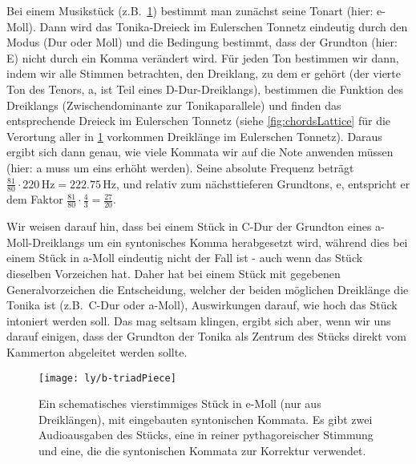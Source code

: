 \documentclass[ngerman,11pt]{scrartcl}
\begin{document}
Bei einem Musikstück (z.B.\ \cref{fig:triadPiece}) bestimmt man zunächst seine
Tonart (hier: e-Moll). Dann wird das Tonika-Dreieck im Eulerschen Tonnetz
eindeutig durch den Modus (Dur oder Moll) und die Bedingung bestimmt, dass der
Grundton (hier: E) nicht durch ein Komma verändert wird. Für jeden Ton bestimmen
wir dann, indem wir alle Stimmen betrachten, den Dreiklang, zu dem er gehört
(der vierte Ton des Tenors, a, ist Teil eines D-Dur-Dreiklangs), bestimmen die
Funktion des Dreiklangs (Zwischendominante zur Tonikaparallele) und finden das
entsprechende Dreieck im Eulerschen Tonnetz (siehe \cref{fig:chordsLattice} für
die Verortung aller in \cref{fig:triadPiece} vorkommen Dreiklänge im Eulerschen
Tonnetz). Daraus ergibt sich dann genau, wie viele Kommata wir auf die Note
anwenden müssen (hier: a muss um eins erhöht werden). Seine absolute Frequenz
beträgt $\frac{81}{80}\cdot 220\,\text{Hz}=222.75\,\text{Hz}$, und relativ zum
nächsttieferen Grundtons, e, entspricht er dem Faktor
$\frac{81}{80}\cdot\frac{4}{3}=\frac{27}{20}$.

Wir weisen darauf hin, dass bei einem Stück in C-Dur der Grundton eines
a-Moll-Dreiklangs um ein syntonisches Komma herabgesetzt wird, während dies bei
einem Stück in a-Moll eindeutig nicht der Fall ist - auch wenn das Stück
dieselben Vorzeichen hat. Daher hat bei einem Stück mit gegebenen
Generalvorzeichen die Entscheidung, welcher der beiden möglichen Dreiklänge die
Tonika ist (z.B.\ C-Dur oder a-Moll), Auswirkungen darauf, wie hoch das Stück
intoniert werden soll. Das mag seltsam klingen, ergibt sich aber, wenn wir uns
darauf einigen, dass der Grundton der Tonika als Zentrum des Stücks direkt vom
Kammerton abgeleitet werden sollte.

\begin{figure}
  \centering
  \texttt{[image: ly/b-triadPiece]}
  \caption{Ein schematisches vierstimmiges Stück in e-Moll (nur aus
  	Dreiklängen), mit eingebauten syntonischen Kommata. Es gibt zwei
  	Audioausgaben des Stücks, eine in reiner pythagoreischer Stimmung und eine,
  	die die syntonischen Kommata zur Korrektur
  	verwendet.}\label{fig:triadPiece}
\end{figure}
\end{document}
